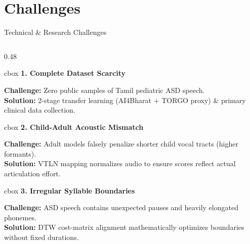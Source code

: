 \documentclass[aspectratio=169, 11pt, xcolor=table]{beamer}
\begin{document}
\section{Challenges}
\begin{frame}{Technical \& Research Challenges}
    \vspace{-3mm} %
    
    
    \begin{columns}[T]
        \begin{column}{0.48\textwidth}
            
            \begin{beamercolorbox}[wd=\linewidth, sep=3pt, rounded=true]{cbox}
                \textbf{\textcolor{amritaMaroon}{\footnotesize 1. Complete Dataset Scarcity}} \\[1mm]
                {\scriptsize \textbf{Challenge:} Zero public samples of Tamil pediatric ASD speech.\\
                \textbf{Solution:} 2-stage transfer learning (AI4Bharat + TORGO proxy) \& primary clinical data collection.\par}
            \end{beamercolorbox}
            \vspace{2mm}
            
            \begin{beamercolorbox}[wd=\linewidth, sep=3pt, rounded=true]{cbox}
                \textbf{\textcolor{amritaMaroon}{\footnotesize 2. Child-Adult Acoustic Mismatch}} \\[1mm]
                {\scriptsize \textbf{Challenge:} Adult models falsely penalize shorter child vocal tracts (higher formants).\\
                \textbf{Solution:} VTLN mapping normalizes audio to ensure scores reflect actual articulation effort.\par}
            \end{beamercolorbox}
            \vspace{2mm}
            
            \begin{beamercolorbox}[wd=\linewidth, sep=3pt, rounded=true]{cbox}
                \textbf{\textcolor{amritaMaroon}{\footnotesize 3. Irregular Syllable Boundaries}} \\[1mm]
                {\scriptsize \textbf{Challenge:} ASD speech contains unexpected pauses and heavily elongated phonemes.\\
                \textbf{Solution:} DTW cost-matrix alignment mathematically optimizes boundaries without fixed durations.\par}
            \end{beamercolorbox}
            

\end{column}
\end{columns}
\end{frame}
\end{document}
